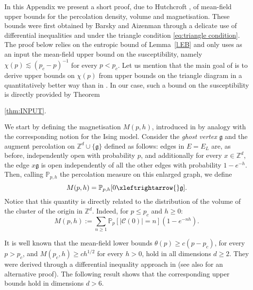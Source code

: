 \documentclass[11pt,a4paper]{article}
\numberwithin{equation}{section}
\theoremstyle{plain}
\theoremstyle{definition}
\newcommand{\connect}{\xleftrightarrow}
\newcommand\fg{\mathfrak{g}}
\newcommand{\Z}{\mathbb{Z}}
\newcommand{\1}{\mathbf 1}
\begin{document}
In this Appendix we present a short proof, due to Hutchcroft \cite{hutchcroft2022derivation}, of mean-field upper bounds for the percolation density, volume and magnetisation.  These bounds were first obtained by Barsky and Aizenman \cite{BarskyAizenmanCriticalExponentPercoUnderTriangle1991} through a delicate use of differential inequalities and under the triangle condition \eqref{eq:triangle condition}. 
The proof below relies on the entropic bound of Lemma~\ref{l.EB} and only uses as an input the mean-field upper bound on the susceptibility, namely $\chi(p)\lesssim (p_c-p)^{-1}$ for every $p<p_c$. 
Let us mention that the main goal of \cite{hutchcroft2022derivation} is to derive upper bounds on $\chi(p)$ from upper bounds on the triangle diagram in a quantitatively better way than in \cite{BarskyAizenmanCriticalExponentPercoUnderTriangle1991}. In our case, such a bound on the susceptibility is directly provided by Theorem~{\ref{thm:INPUT}.

We start by defining the magnetisation $M(p,h)$, introduced in \cite{AizenmanBarsky1987sharpnessPerco} by analogy with the corresponding notion for the Ising model. Consider the \emph{ghost vertex} $\fg$ and the augment percolation on $\mathbb Z^d\cup \{\fg\}$ defined as follows: edges in $E=E_L$ are, as before, independently open with probability $p$, and additionally for every $x\in \mathbb Z^d$, the edge $x\fg$ is open independently of all the other edges with probability $1-e^{-h}$. Then, calling $\mathbb P_{p,h}$ the percolation measure on this enlarged graph, we define
\begin{equation}
	M(p,h)=\mathbb P_{p,h}[0\connect{}\fg].
\end{equation}
Notice that this quantity is directly related to the distribution of the volume of the cluster of the origin in $\Z^d$. Indeed, for $p\leq p_c$ and $h\geq 0$:
\begin{equation}
	M(p,h):=\sum_{n\geq 1}\mathbb P_p[|\mathcal C(0)|=n](1-e^{-nh}).
\end{equation}

It is well known that the mean-field lower bounds $\theta(p)\geq c(p-p_c)$, for every $p>p_c$, and $M(p_c,h)\geq ch^{1/2}$ for every $h>0$, hold in all dimensions $d\geq 2$.
They were derived through a differential inequality approach in \cite{AizenmanBarsky1987sharpnessPerco} (see also \cite{DuminilTassionNewProofSharpness2016} for an alternative proof). 
The following result shows that the corresponding upper bounds hold in dimensions $d>6$. 

}
\end{document}
